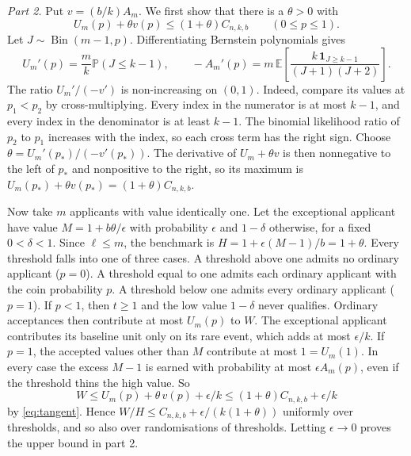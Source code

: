 \documentclass[11pt,a4paper]{article}
\theoremstyle{remark}
\newcommand{\E}{\mathbb E}
\newcommand{\Prob}{\mathbb P}
\newcommand{\Bin}{\operatorname{Bin}}
\begin{document}
\emph{Part 2.} Put $v=(b/k)A_m$. We first show that there is a $\theta>0$ with
\begin{equation}\label{eq:tangent}
 U_m(p)+\theta v(p)\le (1+\theta)C_{n,k,b}\qquad(0\le p\le1).
\end{equation}
Let $J\sim\Bin(m-1,p)$. Differentiating Bernstein polynomials gives
\[
 U_m'(p)=\frac{m}{k}\Prob(J\le k-1),\qquad
 -A_m'(p)=m\,\E\!\left[\frac{k\,\mathbf1_{J\ge k-1}}{(J+1)(J+2)}\right].
\]
The ratio $U_m'/(-v')$ is non-increasing on $(0,1)$. Indeed, compare its values at $p_1<p_2$ by cross-multiplying. Every index in the numerator is at most $k-1$, and every index in the denominator is at least $k-1$. The binomial likelihood ratio of $p_2$ to $p_1$ increases with the index, so each cross term has the right sign. Choose $\theta=U_m'(p_*)/(-v'(p_*))$. The derivative of $U_m+\theta v$ is then nonnegative to the left of $p_*$ and nonpositive to the right, so its maximum is $U_m(p_*)+\theta v(p_*)=(1+\theta)C_{n,k,b}$.

Now take $m$ applicants with value identically one. Let the exceptional applicant have value $M=1+b\theta/\epsilon$ with probability $\epsilon$ and $1-\delta$ otherwise, for a fixed $0<\delta<1$. Since $\ell\le m$, the benchmark is $H=1+\epsilon(M-1)/b=1+\theta$. Every threshold falls into one of three cases. A threshold above one admits no ordinary applicant ($p=0$). A threshold equal to one admits each ordinary applicant with the coin probability $p$. A threshold below one admits every ordinary applicant ($p=1$). If $p<1$, then $t\ge1$ and the low value $1-\delta$ never qualifies. Ordinary acceptances then contribute at most $U_m(p)$ to $W$. The exceptional applicant contributes its baseline unit only on its rare event, which adds at most $\epsilon/k$. If $p=1$, the accepted values other than $M$ contribute at most $1=U_m(1)$. In every case the excess $M-1$ is earned with probability at most $\epsilon A_m(p)$, even if the threshold thins the high value. So
\[
 W\le U_m(p)+\theta\,v(p)+\epsilon/k\le(1+\theta)C_{n,k,b}+\epsilon/k
\]
by \eqref{eq:tangent}. Hence $W/H\le C_{n,k,b}+\epsilon/(k(1+\theta))$ uniformly over thresholds, and so also over randomisations of thresholds. Letting $\epsilon\to0$ proves the upper bound in part 2.
\end{document}
